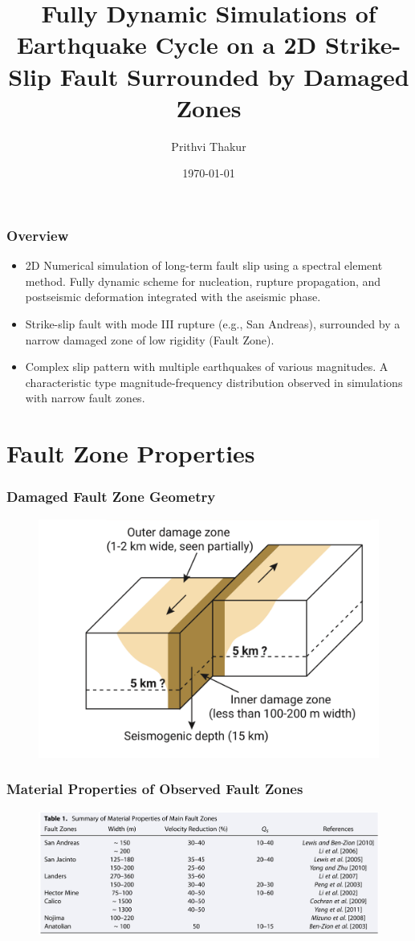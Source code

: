 \documentclass{beamer}
\title[MFD in EQ Cycles]{Fully Dynamic Simulations of Earthquake Cycle on a 2D Strike-Slip Fault Surrounded by Damaged Zones}
\author{Prithvi Thakur}
\institute[UofM]
{
Research Advisor: Yihe Huang \\
\medskip
University of Michigan \\ %
\medskip
\textit{prith@umich.edu} %
}
\date{\today} %
\begin{document}
\begin{frame}
    \titlepage 
\end{frame}

\begin{frame}
    \frametitle{Overview}
    \begin{itemize}
        \item 2D Numerical simulation of long-term fault slip using a spectral element method. Fully dynamic scheme for nucleation, rupture propagation, and postseismic deformation integrated with the aseismic phase. 
        \item Strike-slip fault with mode III rupture (e.g., San Andreas), surrounded by a narrow damaged zone
            of low rigidity (Fault Zone).
        \item Complex slip pattern with multiple earthquakes of various magnitudes. A characteristic type magnitude-frequency distribution observed in simulations with narrow fault zones.
    \end{itemize}
\end{frame}

\section{Fault Zone Properties}
\begin{frame}
    \frametitle{Damaged Fault Zone Geometry}
    \begin{figure}
        \includegraphics[width=0.9\linewidth]{images/fault_zone1.png}
    \end{figure}
\end{frame}
\begin{frame}
    \frametitle{Material Properties of Observed Fault Zones}
    \begin{figure}
        \includegraphics[width=0.9\linewidth]{images/faultzonetable.png}
    \end{figure}
\end{frame}
\end{document}
